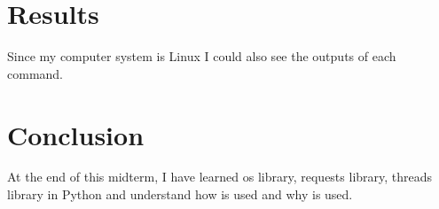 \documentclass[onecolumn]{article}
\begin{document}
\section{Results}
Since my computer system is Linux I could also see the outputs of each command. 


\section{Conclusion}
At the end of this midterm, I have learned os library, requests library, threads library in Python and understand how is used and why is used. 


\nocite{*}


\end{document}

